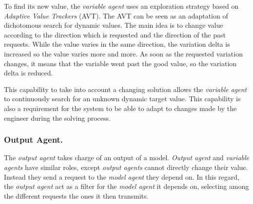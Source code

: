 To find its new value, the \emph{variable agent} uses an exploration strategy based on \emph{Adaptive Value Trackers} (AVT)\cite{Lemouzy_2011}. The AVT can be seen as an adaptation of dichotomous search for dynamic values. The main idea is to change value according to the direction which is requested and the direction of the past requests. While the value varies in the same direction, the variation delta is increased so the value varies more and more. As soon as the requested variation changes, it means that the variable went past the good value, so the variation delta is reduced.


This capability to take into account a changing solution allows the \emph{variable agent} to continuously search for an unknown dynamic target value. This capability is also a requirement for the system to be able to adapt to changes made by the engineer during the solving process.

\subsubsection*{Output Agent.}
The \emph{output agent} takes charge of an output of a model. \emph{Output agent} and \emph{variable agents} have similar roles, except \emph{output agents} cannot directly change their value. Instead they send a request to the \emph{model agent} they depend on. In this regard, the \emph{output agent} act as a filter for the \emph{model agent} it depends on, selecting among the different requests the ones it then transmits.



